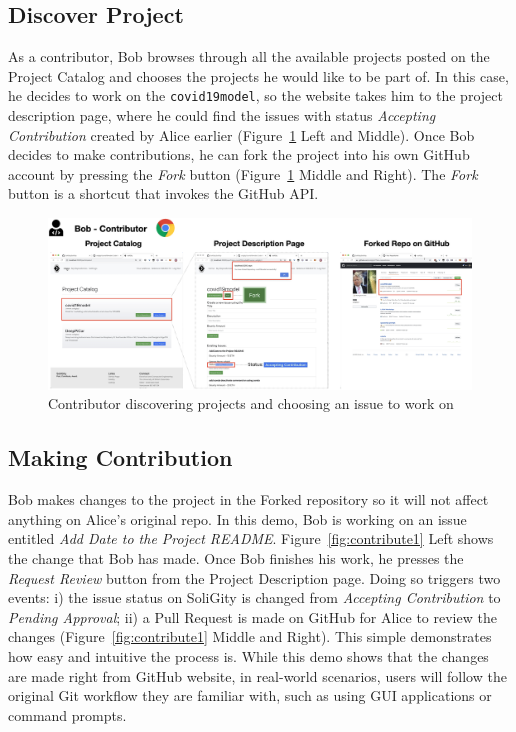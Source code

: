 \documentclass[12pt]{article}
\renewcommand{\_}{\kern-1.5pt\textunderscore\kern-1.5pt}
\begin{document}
\subsection{Discover Project}

As a contributor, Bob browses through all the available projects posted on the Project Catalog and
chooses the projects he would like to be part of. In this case, he decides to work on the \texttt{covid19model},
so the website takes him to the project description page, where he could find the issues with status
\textit{Accepting Contribution} created by Alice earlier (Figure~\ref{fig:discover1} Left and Middle).
Once Bob decides to make contributions, he can fork the project into his own GitHub account by pressing
the \textit{Fork} button (Figure~\ref{fig:discover1} Middle and Right). The \textit{Fork} button is a
shortcut that invokes the GitHub API.

\begin{figure}[H]
	\centering
	\includegraphics[width=16cm]{graphs/52. discover_1.png}
	\caption{Contributor discovering projects and choosing an issue to work on}
	\label{fig:discover1}
\end{figure}

\subsection{Making Contribution}

Bob makes changes to the project in the Forked repository so it will not affect anything on Alice's
original repo. In this demo, Bob is working on an issue entitled \textit{Add Date to the Project README}.
Figure~\ref{fig:contribute1} Left shows the change that Bob has made. Once Bob finishes his work, he
presses the \textit{Request Review} button from the Project Description page. Doing so triggers two
events: i) the issue status on SoliGity is changed from \textit{Accepting Contribution} to
\textit{Pending Approval}; ii) a Pull Request is made on GitHub for Alice to review the changes
(Figure~\ref{fig:contribute1} Middle and Right).  This simple demonstrates how easy and intuitive the
process is. While this demo shows that the changes are made right from GitHub website, in real-world
scenarios, users will follow the original Git workflow they are familiar with, such as using GUI
applications or command prompts.
\end{document}
